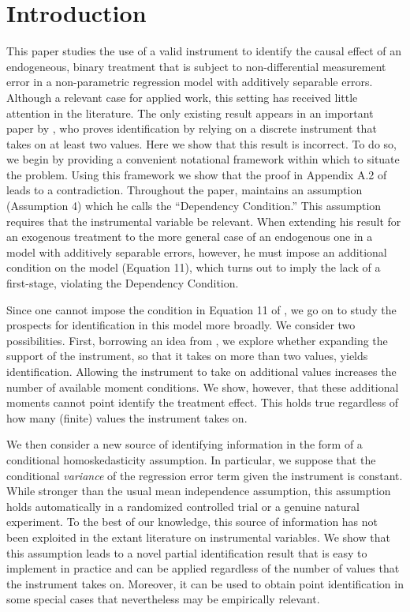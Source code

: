 \section{Introduction}

This paper studies the use of a valid instrument to identify the causal effect of an endogeneous, binary treatment that is subject to non-differential measurement error in a non-parametric regression model with additively separable errors. 
Although a relevant case for applied work, this setting has received little attention in the literature.
The only existing result appears in an important paper by \cite{Mahajan}, who proves identification by relying on a discrete instrument that takes on at least two values.   
Here we show that this result is incorrect. 
To do so, we begin by providing a convenient notational framework within which to situate the problem.
Using this framework we show that the proof in Appendix A.2 of \cite{Mahajan} leads to a contradiction.
Throughout the paper, \cite{Mahajan} maintains an assumption (Assumption 4) which he calls the ``Dependency Condition.'' 
This assumption requires that the instrumental variable be relevant.
When extending his result for an exogenous treatment to the more general case of an endogenous one in a model with additively separable errors, however, he must impose an additional condition on the model (Equation 11), which turns out to imply the lack of a first-stage, violating the Dependency Condition.

Since one cannot impose the condition in Equation 11 of \cite{Mahajan}, we go on to study the prospects for identification in this model more broadly.
We consider two possibilities.
First, borrowing an idea from \cite{Lewbel}, we explore whether expanding the support of the instrument, so that it takes on more than two values, yields identification.
Allowing the instrument to take on additional values increases the number of available moment conditions.
We show, however, that these additional moments cannot point identify the treatment effect.
This holds true regardless of how many (finite) values the instrument takes on.

We then consider a new source of identifying information in the form of a conditional homoskedasticity assumption. 
In particular, we suppose that the conditional \emph{variance} of the regression error term given the instrument is constant.
While stronger than the usual mean independence assumption, this assumption holds automatically in a randomized controlled trial or a genuine natural experiment. 
To the best of our knowledge, this source of information has not been exploited in the extant literature on instrumental variables.  
We show that this assumption leads to a novel partial identification result that is easy to implement in practice and can be applied regardless of the number of values that the instrument takes on.
Moreover, it can be used to obtain point identification in some special cases that nevertheless may be empirically relevant. 

